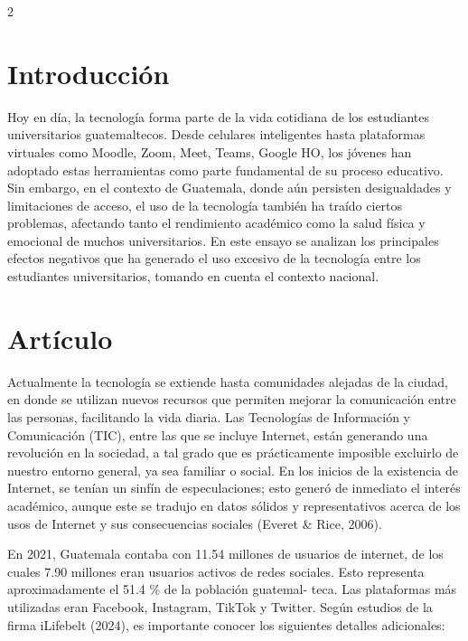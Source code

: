 \documentclass[12pt,spanish,Letterpaper,openany]{book}
\begin{document}
\begin {multicols}{2}
\hypertarget{introducciuxf3n}{%
\section{Introducción}\label{introducciuxf3n}}

Hoy en día, la tecnología forma parte de la vida cotidiana de los estudiantes universitarios guatemaltecos. Desde celulares inteligentes hasta plataformas virtuales como Moodle, Zoom, Meet, Teams, Google HO, los jóvenes han adoptado estas herramientas como parte fundamental de su proceso educativo. Sin embargo, en el contexto de Guatemala, donde aún persisten desigualdades y limitaciones de acceso, el uso de la tecnología también ha traído ciertos problemas, afectando tanto el rendimiento académico como la salud física y emocional de muchos universitarios. En este ensayo se analizan los principales efectos negativos que ha generado el uso excesivo de la tecnología entre los estudiantes universitarios, tomando en cuenta el contexto nacional.

\hypertarget{artuxedculo}{%
\section{Artículo}\label{artuxedculo}}

Actualmente la tecnología se extiende hasta comunidades alejadas de la ciudad, en donde se utilizan nuevos recursos que permiten mejorar la comunicación entre las personas, facilitando la vida diaria. Las Tecnologías de Información y Comunicación (TIC), entre las que se incluye Internet, están generando una revolución en la sociedad, a tal grado que es prácticamente imposible excluirlo de nuestro entorno general, ya sea familiar o social. En los inicios de la existencia de Internet, se tenían un sinfín de especulaciones; esto generó de inmediato el interés académico, aunque este se tradujo en datos sólidos y representativos acerca de los usos de Internet y sus consecuencias sociales (Everet \& Rice, 2006).

En 2021, Guatemala contaba con 11.54 millones de usuarios de internet, de los cuales 7.90 millones eran usuarios activos de redes sociales. Esto representa aproximadamente el 51.4 \% de la población guatemal-
teca. Las plataformas más utilizadas eran Facebook, Instagram, TikTok y Twitter. Según estudios de la firma iLifebelt (2024), es importante conocer los siguientes detalles adicionales:

\medskip
\medskip
\medskip


\end{multicols}
\end{document}
